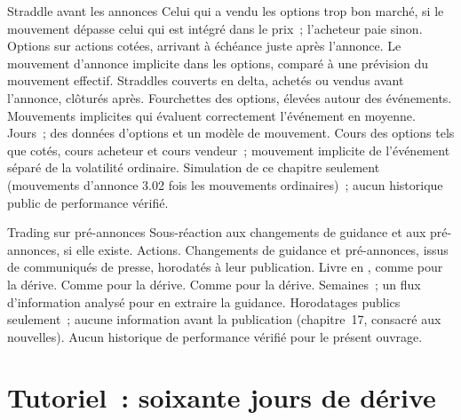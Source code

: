 \begin{strategyfile}{Straddle avant les annonces}\label{strat:s1:earnings:straddle}
 Celui qui a vendu les options trop bon marché, si le mouvement dépasse celui qui est intégré dans le prix~; l'acheteur paie sinon.
 Options sur actions cotées, arrivant à échéance juste après l'annonce.
 Le mouvement d'annonce implicite dans les options, comparé à une prévision du mouvement effectif.
 Straddles couverts en delta, achetés ou vendus avant l'annonce, clôturés après.
 Fourchettes des options, élevées autour des événements.
 Mouvements implicites qui évaluent correctement l'événement en moyenne.
 Jours~; des données d'options et un modèle de mouvement.
 Cours des options tels que cotés, cours acheteur et cours vendeur~; mouvement implicite de l'événement séparé de la volatilité ordinaire.
 Simulation de ce chapitre seulement (mouvements d'annonce 3.02 fois les mouvements ordinaires)~; aucun historique public de performance vérifié.
\end{strategyfile}

\begin{strategyfile}{Trading sur pré-annonces}\label{strat:s1:earnings:preannounce}
 Sous-réaction aux changements de guidance et aux pré-annonces, si elle existe.
 Actions.
 Changements de guidance et pré-annonces, issus de communiqués de presse, horodatés à leur publication.
 Livre en , comme pour la dérive.
 Comme pour la dérive.
 Comme pour la dérive.
 Semaines~; un flux d'information analysé pour en extraire la guidance.
 Horodatages publics seulement~; aucune information avant la publication (chapitre~17, consacré aux nouvelles).
 Aucun historique de performance vérifié pour le présent ouvrage.
\end{strategyfile}

\section{Tutoriel~: soixante jours de dérive}\label{tut:s1:earnings:tut}

